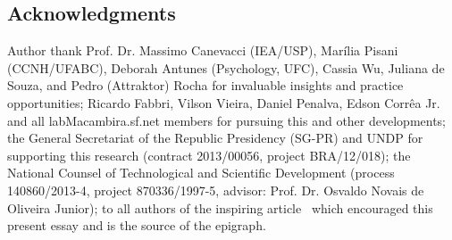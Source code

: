 \documentclass[a4paper, 11pt]{article} %
\newcommand{\aab}{\textsc{aa}}
\newcommand{\ontologiaa}{\textsc{o}ntologi\textsc{aa}}
\begin{document}
\subsection*{Acknowledgments}
Author thank Prof. Dr. Massimo Canevacci (IEA/USP), Marília Pisani (CCNH/UFABC), 
Deborah Antunes (Psychology, UFC), Cassia Wu, Juliana de Souza, and Pedro (Attraktor) Rocha for invaluable insights
and practice opportunities; Ricardo Fabbri, Vilson Vieira, Daniel Penalva, Edson Corrêa Jr. and all
labMacambira.sf.net members for pursuing this and other developments;
the General Secretariat of the Republic Presidency (SG-PR) and UNDP for supporting this
research (contract 2013/00056, project BRA/12/018); the National Counsel of Technological 
and Scientific Development (process 140860/2013-4, project 870336/1997-5,
advisor: Prof. Dr. Osvaldo Novais de Oliveira Junior);
to all authors of the inspiring article~\cite{life} which encouraged this present essay
and is the source of the epigraph.













%
%



\end{document}
